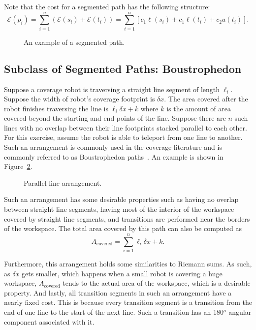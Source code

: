 \documentclass[../main.tex]{subfiles}
\begin{document}
Note that the cost for a segmented path has the following structure:
\begin{equation}
	\label{eq:segmented_cost}
	\mathcal{E}(p_i)=\sum_{i=1}^n(\mathcal{E}(s_i)+\mathcal{E}(t_i))=\sum_{i=1}^n[c_1\ell(s_i)+c_1\ell(t_i)+c_2a(t_i)].
\end{equation}

\begin{figure}
	\centering
	
	\caption{An example of a segmented path.}
	\label{fig:segmented}
\end{figure}


\subsection{Subclass of Segmented Paths: Boustrophedon}
\label{subsection:boustrophedon_type_path}

Suppose a coverage robot is traversing a straight line segment of length $\ell_i$. Suppose the width of robot's coverage footprint is $\delta x$. The area covered after the robot finishes traversing the line is $\ell_i\delta x+k$ where $k$ is the amount of area covered beyond the starting and end points of the line. Suppose there are $n$ such lines with no overlap between their line footprints stacked parallel to each other. For this exercise, assume the robot is able to teleport from one line to another. Such an arrangement is commonly used in the coverage literature and is commonly referred to as Boustrophedon paths~\cite{Choset1998coverage}. An example is shown in Figure~\ref{fig:riemann_sum}.

\begin{figure}
	\centering
	
	\caption{Parallel line arrangement.}
	\label{fig:riemann_sum}
\end{figure}

Such an arrangement has some desirable properties such as having no overlap between straight line segments, having most of the interior of the workspace covered by straight line segments, and transitions are performed near the borders of the workspace. The total area covered by this path can also be computed as
\begin{equation}
	A_{\text{covered}}=\sum_{i=1}^n\ell_i\delta x + k.
\end{equation}

Furthermore, this arrangement holds some similarities to Riemann sums. As such, as $\delta x$ gets smaller, which happens when a small robot is covering a huge workspace, $A_{\text{covered}}$ tends to the actual area of the workspace, which is a desirable property. And lastly, all transition segments in such an arrangement have a nearly fixed cost. This is because every transition segment is a transition from the end of one line to the start of the next line. Such a transition has an 180$^o$ angular component associated with it.
\end{document}
